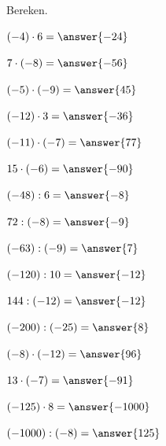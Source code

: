 \documentclass{ximera}
\begin{document}
\begin{oefening}{\oefB\ESS}

Bereken.

\begin{question} \((-4)\cdot6=\answer{-24}\) \end{question}

\begin{question} \(7\cdot(-8)=\answer{-56}\) \end{question}

\begin{question} \((-5)\cdot(-9)=\answer{45}\) \end{question}

\begin{question} \((-12)\cdot3=\answer{-36}\) \end{question}

\begin{question} \((-11)\cdot(-7)=\answer{77}\) \end{question}

\begin{question} \(15\cdot(-6)=\answer{-90}\) \end{question}

\begin{question} \((-48):6=\answer{-8}\) \end{question}

\begin{question} \(72:(-8)=\answer{-9}\) \end{question}

\begin{question} \((-63):(-9)=\answer{7}\) \end{question}

\begin{question} \((-120):10=\answer{-12}\) \end{question}

\begin{question} \(144:(-12)=\answer{-12}\) \end{question}

\begin{question} \((-200):(-25)=\answer{8}\) \end{question}

\begin{question} \((-8)\cdot(-12)=\answer{96}\) \end{question}

\begin{question} \(13\cdot(-7)=\answer{-91}\) \end{question}

\begin{question} \((-125)\cdot8=\answer{-1000}\) \end{question}

\begin{question} \((-1000):(-8)=\answer{125}\) \end{question}

\end{oefening}
\end{document}
